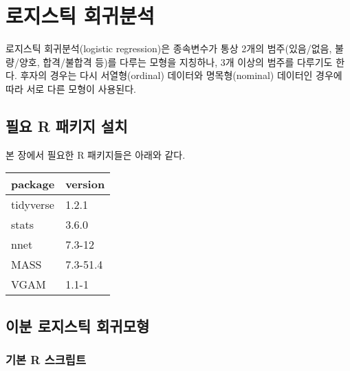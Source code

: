 \documentclass[]{book}
\begin{document}
\hypertarget{logistic-regression}{%
\chapter{로지스틱 회귀분석}\label{logistic-regression}}

로지스틱 회귀분석(logistic regression)은 종속변수가 통상 2개의 범주(있음/없음, 불량/양호, 합격/불합격 등)를 다루는 모형을 지칭하나, 3개 이상의 범주를 다루기도 한다. 후자의 경우는 다시 서열형(ordinal) 데이터와 명목형(nominal) 데이터인 경우에 따라 서로 다른 모형이 사용된다.

\hypertarget{logistic-packages-install}{%
\section{필요 R 패키지 설치}\label{logistic-packages-install}}

본 장에서 필요한 R 패키지들은 아래와 같다.

\begin{tabular}{l|l}
\hline
package & version\\
\hline
tidyverse & 1.2.1\\
\hline
stats & 3.6.0\\
\hline
nnet & 7.3-12\\
\hline
MASS & 7.3-51.4\\
\hline
VGAM & 1.1-1\\
\hline
\end{tabular}

\hypertarget{binary-logistic-regression}{%
\section{이분 로지스틱 회귀모형}\label{binary-logistic-regression}}

\hypertarget{bianry-logistic-reg-basic-script}{%
\subsection{기본 R 스크립트}\label{bianry-logistic-reg-basic-script}}
\end{document}
